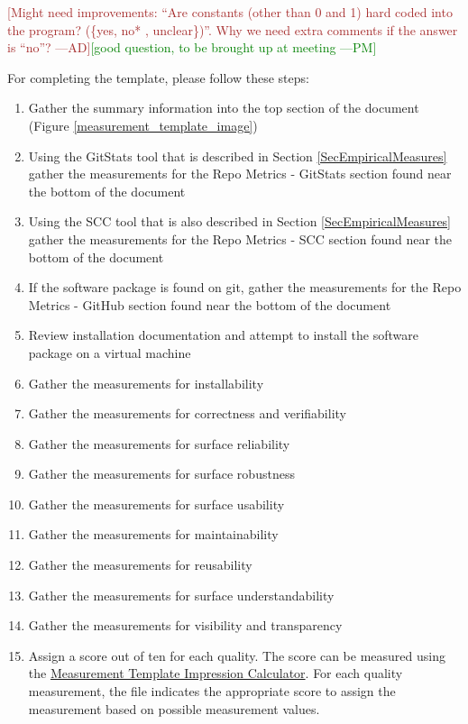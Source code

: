 \documentclass[letterpaper,cleveref]{lipics-v2019}
\newcommand{\authornote}[3]{\textcolor{#1}{[#3 ---#2]}}
\newcommand{\authornote}[3]{}
\newcommand{\pmi}[1]{\authornote{green}{PM}{#1}} %
\newcommand{\ad}[1]{\authornote{brown}{AD}{#1}} %
\theoremstyle{definition}
\begin{document}
\ad{Might need improvements: ``Are constants (other than 0 and 1) hard coded
	into the program? (\{yes, no* , unclear\})''. Why we need extra comments if the	answer is ``no''?}\pmi{good question, to be brought up at meeting}


For completing the template, please follow these steps:

\begin{enumerate} 
	\item Gather the summary information into the top section of the document (Figure \ref{measurement_template_image})
	\item Using the GitStats tool that is described in Section \ref{SecEmpiricalMeasures} gather the measurements for the Repo Metrics - GitStats section found near the bottom of the document
	\item Using the SCC tool that is also described in Section \ref{SecEmpiricalMeasures} gather the measurements for the Repo Metrics - SCC section found near the bottom of the document
	\item If the software package is found on git, gather the measurements for the Repo Metrics - GitHub section found near the bottom of the document
	\item Review installation documentation and attempt to install the software package on a virtual machine
	\item Gather the measurements for installability
	\item Gather the measurements for correctness and verifiability
	\item Gather the measurements for surface reliability
	\item Gather the measurements for surface robustness
	\item Gather the measurements for surface usability
	\item Gather the measurements for maintainability
	\item Gather the measurements for reusability
	\item Gather the measurements for surface understandability
	\item Gather the measurements for visibility and transparency
	\item Assign a score out of ten for each quality. The score can be measured using the \href{https://github.com/smiths/AIMSS/blob/master/StateOfPractice/Methodology/MeasurementTemplate_ImpressionCalculator.xlsx}{Measurement Template Impression Calculator}. For each quality measurement, the file indicates the appropriate score to assign the measurement based on possible measurement values.
\end{enumerate}
\end{document}

